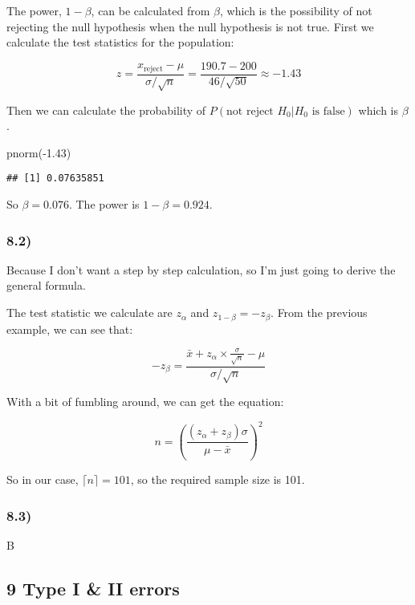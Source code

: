 \documentclass[
]{article}
\newenvironment{Shaded}{\begin{snugshade}}{\end{snugshade}}
\newcommand{\FloatTok}[1]{\textcolor[rgb]{0.00,0.00,0.81}{#1}}
\newcommand{\FunctionTok}[1]{\textcolor[rgb]{0.00,0.00,0.00}{#1}}
\newcommand{\NormalTok}[1]{#1}
\newcommand{\SpecialCharTok}[1]{\textcolor[rgb]{0.00,0.00,0.00}{#1}}
\begin{document}
The power, \(1-\beta\), can be calculated from \(\beta\), which is the
possibility of not rejecting the null hypothesis when the null
hypothesis is not true. First we calculate the test statistics for the
population:

\[
z = \frac{x_{\text{reject}} - \mu}{\sigma / \sqrt{n}} = \frac{190.7 - 200}{46/\sqrt{50}} \approx -1.43
\]

Then we can calculate the probability of
\(P( \text{not reject } H_0 | H_0 \text{ is false})\) which is
\(\beta\).

\begin{Shaded}
\begin{Highlighting}[]
\FunctionTok{pnorm}\NormalTok{(}\SpecialCharTok{{-}}\FloatTok{1.43}\NormalTok{)}
\end{Highlighting}
\end{Shaded}

\begin{verbatim}
## [1] 0.07635851
\end{verbatim}

So \(\beta = 0.076\). The power is \(1-\beta = 0.924\).

\hypertarget{section-19}{%
\subsubsection{8.2)}\label{section-19}}

Because I don't want a step by step calculation, so I'm just going to
derive the general formula.

The test statistic we calculate are \(z_\alpha\) and
\(z_{1-\beta} = -z_\beta\). From the previous example, we can see that:

\[
-z_\beta = \frac{\bar x + z_\alpha \times \frac{\sigma}{\sqrt{n}} - \mu}{\sigma / \sqrt{n}}
\]

With a bit of fumbling around, we can get the equation:

\[
n = (\frac{(z_\alpha + z_\beta) \sigma}{\mu - \bar x})^2
\]

So in our case, \(\lceil n \rceil = 101\), so the required sample size
is 101.

\hypertarget{section-20}{%
\subsubsection{8.3)}\label{section-20}}

B

\hypertarget{type-i-ii-errors}{%
\subsection{9 Type I \& II errors}\label{type-i-ii-errors}}
\end{document}
